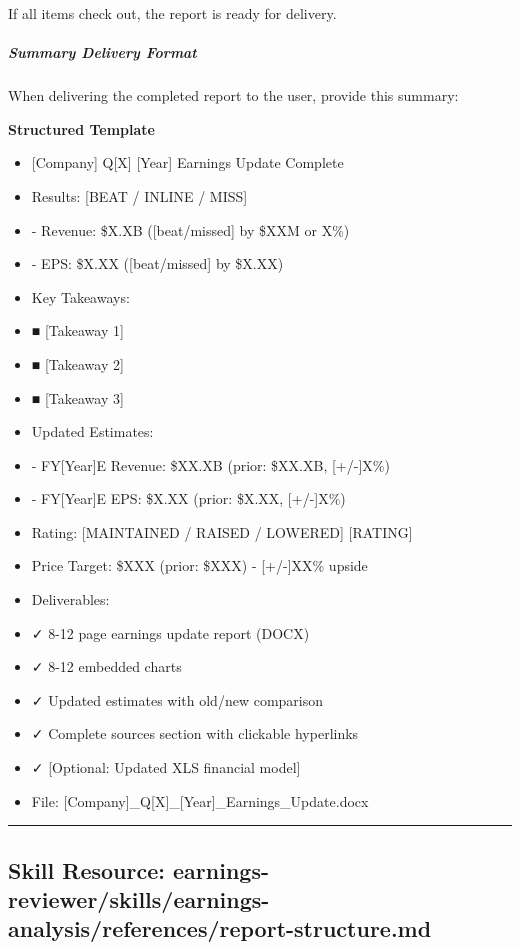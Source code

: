 \documentclass[11pt]{article}
\begin{document}
If all items check out, the report is ready for delivery.


\subparagraph{Summary Delivery Format}\mbox{}\par

When delivering the completed report to the user, provide this summary:


\textbf{Structured Template}
\begin{itemize}[leftmargin=*,itemsep=2pt,topsep=2pt]
\item {} [Company] Q[X] [Year] Earnings Update Complete
\item {} Results: [BEAT / INLINE / MISS]
\item {} - Revenue: \$X.XB ([beat/missed] by \$XXM or X\%)
\item {} - EPS: \$X.XX ([beat/missed] by \$X.XX)
\item {} Key Takeaways:
\item {} ■ [Takeaway 1]
\item {} ■ [Takeaway 2]
\item {} ■ [Takeaway 3]
\item {} Updated Estimates:
\item {} - FY[Year]E Revenue: \$XX.XB (prior: \$XX.XB, [+/-]X\%)
\item {} - FY[Year]E EPS: \$X.XX (prior: \$X.XX, [+/-]X\%)
\item {} Rating: [MAINTAINED / RAISED / LOWERED] [RATING]
\item {} Price Target: \$XXX (prior: \$XXX) - [+/-]XX\% upside
\item {} Deliverables:
\item {} ✓ 8-12 page earnings update report (DOCX)
\item {} ✓ 8-12 embedded charts
\item {} ✓ Updated estimates with old/new comparison
\item {} ✓ Complete sources section with clickable hyperlinks
\item {} ✓ [Optional: Updated XLS financial model]
\item {} File: [Company]\_\allowbreak{}Q[X]\_\allowbreak{}[Year]\_\allowbreak{}Earnings\_\allowbreak{}Update.docx
\end{itemize}

\vspace{0.8em}\hrule\vspace{0.8em}

\subsection{Skill Resource: earnings-reviewer/skills/earnings-analysis/references/report-structure.md}\label{file:earnings-reviewer-skills-earnings-analysis-references-report-structure-md}
\end{document}
